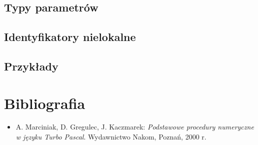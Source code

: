 \documentclass[12pt]{article}
\begin{document}
		\subsection{Typy parametrów}
		\subsection{Identyfikatory nielokalne}
		\subsection{Przykłady}

	\section{Bibliografia}
		\begin{itemize}
			\item A. Marciniak, D. Gregulec, J. Kaczmarek: \textsl{Podstawowe procedury numeryczne w języku Turbo Pascal}. Wydawnictwo Nakom, Poznań, 2000 r.
		\end{itemize}
\end{document}
